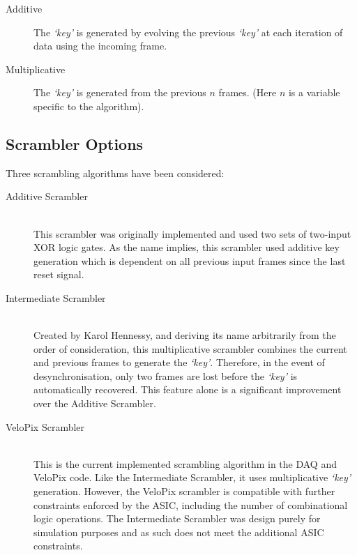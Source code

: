 	\begin{description}
		\item[Additive] The \textit{`key'} is generated by evolving the previous \textit{`key'} at each iteration of data using the incoming frame.
		\item[Multiplicative] The  \textit{`key'} is generated from the previous $n$ frames. (Here $n$ is a variable specific to the algorithm).
	\end{description}

	\subsection{Scrambler Options}
	\label{sub:scrambler_options}

		Three scrambling algorithms have been considered:

		\begin{description}
			\item[Additive Scrambler] \hfill \\
				This scrambler was originally implemented and used two sets of two-input XOR logic gates.
				As the name implies, this scrambler used additive key generation which is dependent on all previous input frames since the last reset signal.

			\item[Intermediate Scrambler] \hfill \\
				Created by Karol Hennessy, and deriving its name arbitrarily from the order of consideration, this multiplicative scrambler combines the current and previous frames to generate the \textit{`key'}.
				Therefore, in the event of desynchronisation, only two frames are lost before the \textit{`key'} is automatically recovered.
				This feature alone is a significant improvement over the Additive Scrambler.

			\item[VeloPix Scrambler] \hfill \\
				This is the current implemented scrambling algorithm in the DAQ and VeloPix code.
				Like the Intermediate Scrambler, it uses multiplicative \textit{`key'} generation.
				However, the VeloPix scrambler is compatible with further constraints enforced by the ASIC, including the number of combinational logic operations.
				The Intermediate Scrambler was design purely for simulation purposes and as such does not meet the additional ASIC constraints.
		\end{description}


